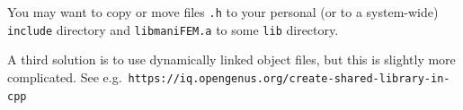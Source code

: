 You may want to copy or move files {\small\tt *.h} to your personal (or to a system-wide)
{\small\tt include} directory and {\small\tt libmaniFEM.a} to some {\small\tt lib} directory.

A third solution is to use dynamically linked object files,
but this is slightly more complicated.
See e.g.\ {\small\tt https://iq.opengenus.org/create-shared-library-in-cpp}


